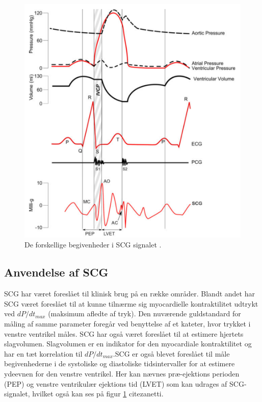 \begin{figure}[H] %
\begin{center}
\includegraphics[width=1\textwidth]{figures/wigger}
\end{center}
\caption{De forskellige begivenheder i SCG signalet \cite{zanetti}.}
\label{fig:wigger}
\end{figure}

\newpage
\subsection{Anvendelse af SCG}
SCG har været foreslået til klinisk brug på en række områder. Blandt andet har SCG været foreslået til at kunne tilnærme sig myocardielle kontraktilitet udtrykt ved $dP/dt_{max}$ (maksimum afledte af tryk). Den nuværende guldstandard for måling af samme parameter foregår ved benyttelse af et kateter, hvor trykket i venstre ventrikel måles. SCG har også været foreslået til at estimere hjertets slagvolumen. Slagvolumen er en indikator for den myocardiale kontraktilitet og har en tæt korrelation til $dP/dt_{max}$.SCG er også blevet foreslået til måle begivenhederne i de systoliske og diastoliske tidsintervaller for at estimere ydeevnen for den venstre ventrikel. Her kan nævnes  præ-ejektions perioden (PEP) og venstre ventrikulær ejektions tid (LVET) som kan udrages af SCG-signalet, hvilket også kan ses på figur \ref{fig:wigger} \╬cite{zanetti}. 

